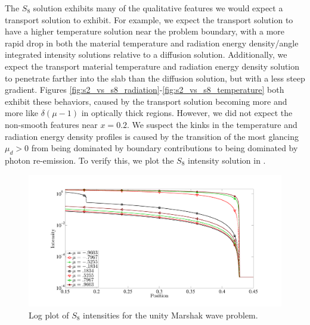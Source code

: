 The $S_8$ solution exhibits many of the qualitative features we would expect a transport solution to exhibit. %
For example, we expect the transport solution to have a higher temperature solution near the problem boundary, with a more rapid drop in both the material temperature and radiation energy density/angle integrated intensity solutions relative to a diffusion solution.
Additionally, we expect the transport material temperature and radiation energy density solution to penetrate farther into the slab than the diffusion solution, but with a less steep gradient.
Figures \ref{fig:s2_vs_s8_radiation}-\ref{fig:s2_vs_s8_temperature} both exhibit these behaviors, caused by the transport solution becoming more and more like $\delta(\mu-1)$ in optically thick regions. 
However, we did not expect the non-smooth features near $x=0.2$.
We suspect the kinks in the temperature and radiation energy density profiles is caused by the transition of the most glancing $\mu_d >0$ from being dominated by boundary contributions to being dominated by photon re-emission.
To verify this, we plot the $S_8$ intensity solution in .
\begin{figure}[!htp]
\centering
\includegraphics[width=16cm,trim=1.5in  0.5in 0.2in 1in,clip=true]{chapter6_grey_radtran/S8_Intensity_SemiLogy.pdf}
\caption{Log plot of $S_8$ intensities for the unity Marshak wave problem.}
\label{fig:s8_intensity_full}
\end{figure}

